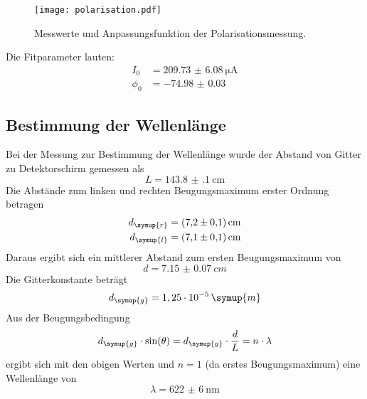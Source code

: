 \begin{figure}[H]
  \centering
  \texttt{[image: polarisation.pdf]}
  \caption{Messwerte und Anpassungsfunktion der Polarisationsmessung.}
  \label{fig:polarisation}
\end{figure}

Die Fitparameter lauten:
\begin{align*}
  I_0 &= \SI{209.73(608)}{\micro\ampere} \\
  \phi_0 &= \SI{-74.98(3)}{}
\end{align*}

\subsection{Bestimmung der Wellenlänge}
Bei der Messung zur Bestimmung der Wellenlänge wurde der Abstand von Gitter zu
Detektorschirm gemessen als
\begin{equation*}
  L = \SI{143.8(1)}{\centi\meter}
\end{equation*}
Die Abstände zum linken und rechten Beugungsmaximum erster Ordnung betragen
\begin{align*}
  d_\symup{r} &= \SI{7.2(1)}{\centi\meter} \\
  d_\symup{l} &= \SI{7.1(1)}{\centi\meter}
\end{align*}
Daraus ergibt sich ein mittlerer Abstand zum ersten Beugungsmaximum von
\begin{equation*}
  d = \SI{7.15(7)}{cm}
\end{equation*}
Die Gitterkonstante beträgt
\begin{equation*}
  d_\symup{g} = 1,25 \cdot 10^{-5} \, \symup{m}
\end{equation*}
Aus der Beugungsbedingung
\begin{equation*}
  d_\symup{g} \cdot \sin(\theta) = d_\symup{g} \cdot \frac{d}{L} = n \cdot \lambda
\end{equation*}
ergibt sich mit den obigen Werten und $n = 1$ (da erstes Beugungsmaximum) eine
Wellenlänge von
\begin{equation*}
  \lambda = \SI{622(6)}{\nano\meter}
\end{equation*}
